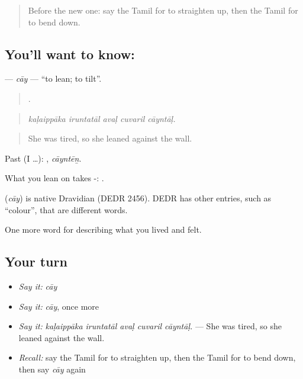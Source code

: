 \label{lesson:TA-C490-cay}



\begin{quote}
Before the new one: say the Tamil for to straighten up, then the Tamil for to bend down.
\end{quote}

\subsection*{You'll want to know: }
\textbf{} — \emph{cāy} — \textquotedblleft{}to lean; to tilt\textquotedblright{}.

\begin{quote}
    .
\end{quote}

\begin{quote}
\emph{kaḷaippāka iruntatāl avaḷ cuvaril cāyntāḷ.}
\end{quote}

\begin{quote}
She was tired, so she leaned against the wall.
\end{quote}

Past (I …): , \emph{cāyntēṉ}.

What you lean on takes -:  .

\begin{cousinweb}
\textbf{} (\emph{cāy}) is native Dravidian (DEDR 2456). DEDR has other  entries, such as \textquotedblleft{}colour\textquotedblright{}, that are different words.
\end{cousinweb}

\begin{grammarlens}[title={What you've built}]
One more word for describing what you lived and felt.
\end{grammarlens}

\subsection*{Your turn}
\begin{itemize}
\raggedright
  \item \emph{Say it:} \emph{cāy}
  \item \emph{Say it:} \emph{cāy}, once more
  \item \emph{Say it:} \emph{kaḷaippāka iruntatāl avaḷ cuvaril cāyntāḷ.} — She was tired, so she leaned against the wall.
  \item \emph{Recall:} say the Tamil for to straighten up, then the Tamil for to bend down, then say \emph{cāy} again
\end{itemize}

